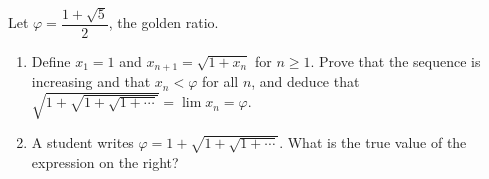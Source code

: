 Let $\varphi=\dfrac{1+\sqrt5}{2}$, the golden ratio.
\begin{enumerate}
\item[(a)] Define $x_1=1$ and $x_{n+1}=\sqrt{1+x_n}$ for $n\ge1$. Prove that the sequence is increasing and that $x_n<\varphi$ for all $n$, and deduce that $\sqrt{1+\sqrt{1+\sqrt{1+\cdots}}}=\lim x_n=\varphi$.
\item[(b)] A student writes $\varphi=1+\sqrt{1+\sqrt{1+\cdots}}$. What is the true value of the expression on the right?
\end{enumerate}
